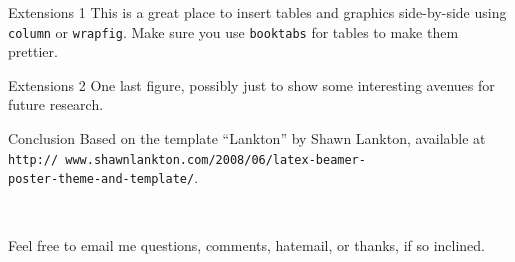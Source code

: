 \documentclass[serif,mathserif,final]{beamer}
\begin{document}
\begin{frame}{}
\begin{columns}[t]
\begin{column}{0.32\linewidth}
      \begin{block}{Extensions 1}
  This is a great place to insert tables and graphics side-by-side using \texttt{column} or \texttt{wrapfig}. Make sure you use \texttt{booktabs} for tables to make them prettier.
      \end{block}

      \begin{block}{Extensions 2}
      One last figure, possibly just to show some interesting avenues for future research. 
      \end{block}

	 \begin{block}{Conclusion}
	Based on the template ``Lankton'' by Shawn Lankton, available at \texttt{http://		www.shawnlankton.com/2008/06/latex-beamer- \\ poster-theme-and-template/}. \par ~ \par
Feel free to email me questions, comments, hatemail, or thanks, if so inclined.
      \end{block}

    \end{column}

  \end{columns}
  

\end{frame}
\end{document}
